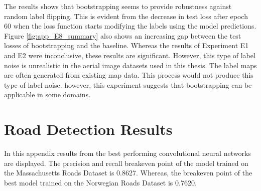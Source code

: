 The results shows that bootstrapping seems to provide robustness against random label flipping. This is evident from the decrease in test loss after epoch 60 when the loss function starts modifying the labels using the model predictions. Figure \ref{fig:app_E8_summary} also shows an increasing gap between the test losses of bootstrapping and the baseline. Whereas the results of Experiment E1 and E2 were inconclusive, these results are significant. However, this type of label noise is unrealistic in the aerial image datasets used in this thesis. The label maps are often generated from existing map data. This process would not produce this type of label noise. however, this experiment suggests that bootstrapping can be applicable in some domains. \pagebreak

\section{Road Detection Results}
\label{app:roaddetectionresults}
In this appendix results from the best performing convolutional neural networks are displayed. The precision and recall breakeven point of the model trained on the Massachusetts Roads Dataset is 0.8627. Whereas, the breakeven point of the best model trained on the Norwegian Roads Dataset is 0.7620.

